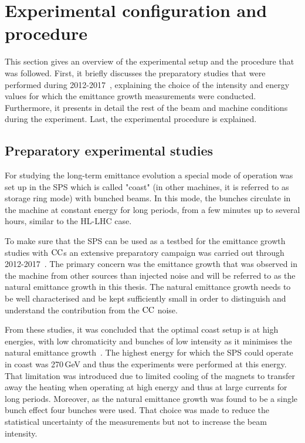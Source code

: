 

\section{Experimental configuration and procedure}\label{sec:exp_setup_2018}
This section gives an overview of the experimental setup and the procedure that was followed. First, it briefly discusses the preparatory studies that were performed during 2012-2017~\cite{Calaga:1451286, Alekou_CC_coast_prep_2016, Antoniou:2649815}, explaining the choice of the intensity and energy values for which the emittance growth measurements were conducted. Furthermore, it presents in detail the rest of the beam and machine conditions during the experiment. Last, the experimental procedure is explained.

\subsection{Preparatory experimental studies}\label{sec:preparatory_studies_for_2018_MD}
For studying the long-term emittance evolution a special mode of operation was set up in the SPS which is called "coast" (in other machines, it is referred to as storage ring mode) with bunched beams. In this mode, the bunches circulate in the machine at constant energy for long periods, from a few minutes up to several hours, similar to the HL-LHC case.\setlength{\parskip}{2ex} %

To make sure that the SPS can be used as a testbed for the emittance growth studies with ${\mathrm{CC}}$s an extensive preparatory campaign was carried out through 2012-2017~\cite{Calaga:1451286, Alekou_CC_coast_prep_2016, Antoniou:2649815}. The primary concern was the emittance growth that was observed in the machine from other sources than injected noise and will be referred to as the natural emittance growth in this thesis. The natural emittance growth needs to be well characterised and be kept sufficiently small in order to distinguish and understand the contribution from the ${\mathrm{CC}}$ noise. 

From these studies, it was concluded that the optimal coast setup is at high energies, with low chromaticity and bunches of low intensity as it minimises the natural emittance growth~\cite{Antoniou:2649815}. The highest energy for which the SPS could operate in coast was 270\,GeV and thus the experiments were performed at this energy.  That limitation was introduced due to limited cooling of the magnets to transfer away the heating when operating at high energy and thus at large currents for long periods. %
Moreover, as the natural emittance growth was found to be a single bunch effect four bunches were used. That choice was made to reduce the statistical uncertainty of the measurements but not to increase the beam intensity.




